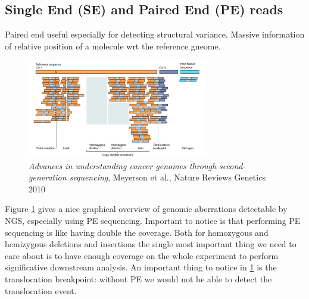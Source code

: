 \subsection{Single End (SE) and Paired End (PE) reads}
Paired end useful especially for detecting structural variance. Massive information of relative position of a molecule wrt the reference gneome.

\begin{figure}[htbp!]
    \centering
    \includegraphics[width=0.7\textwidth]{igv.png}
    \caption{\textit{Advances in understanding cancer genomes through second-generation sequencing}, Meyerson et al., Nature Reviews Genetics 2010}
    \label{fig:igv}
\end{figure}

Figure \ref{fig:igv} gives a nice graphical overview of genomic aberrations detectable by NGS, especially using PE sequencing. 
Important to notice is that performing PE sequencing is like having double the coverage. 
Both for homozygous and hemizygous deletions and insertions the single most important thing we need to care about is to have enough coverage on the whole experiment to perform significative downstream analysis. 
An important thing to notice in \ref{fig:igv} is the translocation breakpoint: without PE we would not be able to detect the translocation event. 

 















